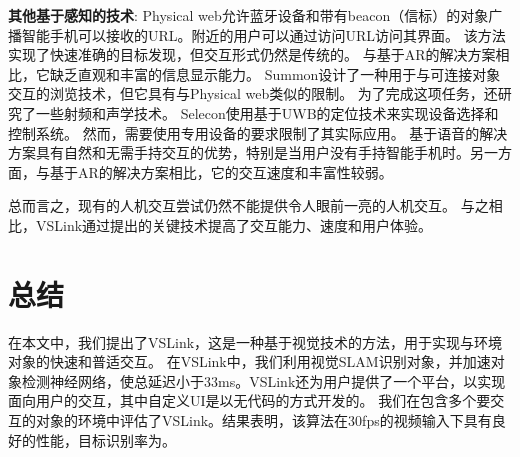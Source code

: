\textbf{其他基于感知的技术}: 
Physical web\cite{jenson2014physical}允许蓝牙设备和带有beacon（信标）的对象广播智能手机可以接收的URL。附近的用户可以通过访问URL访问其界面。
该方法实现了快速准确的目标发现，但交互形式仍然是传统的。
与基于AR的解决方案相比，它缺乏直观和丰富的信息显示能力。
Summon\cite{zachariah2020browsing}设计了一种用于与可连接对象交互的浏览技术，但它具有与Physical web类似的限制。
为了完成这项任务，还研究了一些射频和声学技术\cite{alanwar2017selecon,pu2013whole,mao2016cat}。
Selecon\cite{alanwar2017selecon}使用基于UWB的定位技术来实现设备选择和控制系统。
然而，需要使用专用设备的要求限制了其实际应用。
基于语音的解决方案具有自然和无需手持交互的优势，特别是当用户没有手持智能手机时。另一方面，与基于AR的解决方案相比，它的交互速度和丰富性较弱。

总而言之，现有的人机交互尝试仍然不能提供令人眼前一亮的人机交互。
与之相比，VSLink通过提出的关键技术提高了交互能力、速度和用户体验。

\section{总结}\label{sec:sum}
在本文中，我们提出了VSLink，这是一种基于视觉技术的方法，用于实现与环境对象的快速和普适交互。
在VSLink中，我们利用视觉SLAM识别对象，并加速对象检测神经网络，使总延迟小于33ms。VSLink还为用户提供了一个平台，以实现面向用户的交互，其中自定义UI是以无代码的方式开发的。
我们在包含多个要交互的对象的环境中评估了VSLink。结果表明，该算法在30fps的视频输入下具有良好的性能，目标识别率为{\acc}。







